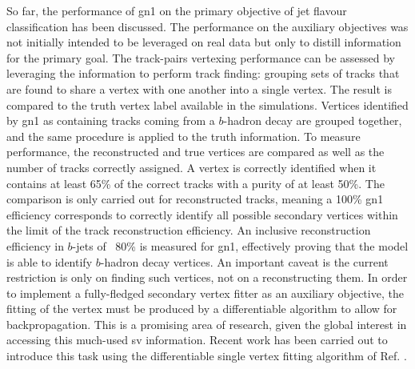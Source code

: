 So far, the performance of \gls{gn1} on the primary objective of jet flavour classification has been discussed. The performance on the auxiliary objectives was not initially intended to be leveraged on real data but only to distill information for the primary goal. The track-pairs vertexing performance can be assessed by leveraging the information to perform track finding: grouping sets of tracks that are found to share a vertex with one another into a single vertex. The result is compared to the truth vertex label available in the simulations. Vertices identified by \gls{gn1} as containing tracks coming from a $b$-hadron decay are grouped together, and the same procedure is applied to the truth information. To measure performance, the reconstructed and true vertices are compared as well as the number of tracks correctly assigned. A vertex is correctly identified when it contains at least 65\% of the correct tracks with a purity of at least 50\%. The comparison is only carried out for reconstructed tracks, meaning a 100\% \gls{gn1} efficiency corresponds to correctly identify all possible secondary vertices within the limit of the track reconstruction efficiency. An inclusive reconstruction efficiency in $b$-jets of ~80\% is measured for \gls{gn1}, effectively proving that the model is able to identify $b$-hadron decay vertices. An important caveat is the current restriction is only on finding such vertices, not on a reconstructing them. In order to implement a fully-fledged secondary vertex fitter as an auxiliary objective, the fitting of the vertex must be produced by a differentiable algorithm to allow for backpropagation. This is a promising area of research, given the global interest in accessing this much-used \gls{sv} information. Recent work has been carried out to introduce this task using the differentiable single vertex fitting algorithm of Ref. \cite{smith2023differentiable}. \\


